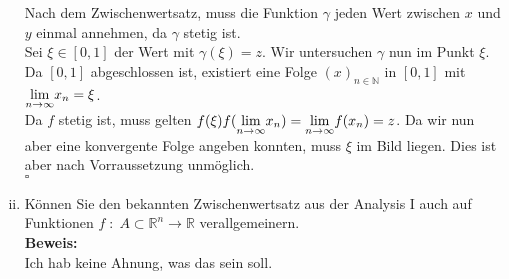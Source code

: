 \begin{enumerate}[(i)]
		Nach dem Zwischenwertsatz, muss die Funktion $\gamma$ jeden Wert zwischen $x$ und $y$ einmal annehmen, da
		$\gamma$ stetig ist.\\

		Sei $\xi \in [0,1]$ der Wert mit $\gamma (\xi) = z$. Wir untersuchen $\gamma$ nun im Punkt $\xi$.\\

		Da $[0,1]$ abgeschlossen ist, existiert eine Folge $(x)_{n \in \mathbb{N}}$ in $[0,1]$ mit $\underset{ n \rightarrow \infty}{\lim} x_n = \xi$.\\

		Da $f$ stetig ist, muss gelten $f(\xi) f( \underset{ n \rightarrow \infty}{\lim} x_n ) = \underset{ n \rightarrow \infty}{\lim} f(x_n) = z$. Da wir nun aber eine
		konvergente Folge angeben konnten, muss $\xi$ im Bild liegen. Dies ist aber nach Vorraussetzung unmöglich.\\

		\mbox{} \hfill $\square$ 

    \item Können Sie den bekannten Zwischenwertsatz aus der Analysis I auch auf Funktionen
        $f \; : \; A \subset \mathbb{R}^n \rightarrow \mathbb{R}$ verallgemeinern.\\
    \textbf{Beweis:}\\
       	Ich hab keine Ahnung, was das sein soll.
\end{enumerate}

